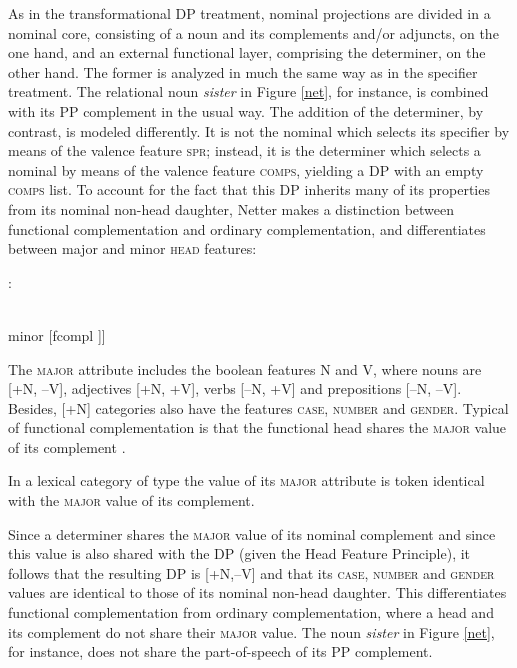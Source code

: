 \documentclass[output=paper
                ,modfonts
                ,nonflat
	        ,collection
	        ,collectionchapter
	        ,collectiontoclongg
 	        ,biblatex
                ,babelshorthands
                ,newtxmath
                ,draftmode
                ,colorlinks, citecolor=brown
]{./langsci/langscibook}
\begin{document}
As in the transformational DP treatment, nominal projections are divided in a nominal core, 
consisting of a noun and its complements and/or adjuncts, on the one hand, and an external 
functional layer, comprising the determiner, on the other hand. The former is analyzed in much the 
same way as in the specifier treatment. The relational noun   
\emph{sister} in Figure \ref{net}, for instance, is combined with 
its PP complement in the usual way. The addition of the determiner, by contrast, is 
modeled differently. It is not the nominal which selects its specifier by means of the valence 
feature \textsc{spr}; instead, it is the determiner which selects a nominal by means of 
the valence feature \textsc{comps}, yielding a DP with an empty \textsc{comps} list. 
To account for the fact that this DP inherits many of its properties from its nominal 
non-head daughter, Netter makes a distinction between functional 
complementation and ordinary complementation, and differentiates between major and minor 
\textsc{head} features: 

\begin{exe} 
\ex {}:\\
 \begin{avm}
                              [major [n \type{boolean} \\
                                      v \type{boolean} ] \\
                               minor [fcompl ]]
                              \end{avm} 
\end{exe} 

\noindent
The \textsc{major} attribute includes the boolean features N and V, where 
nouns are [+N, --V], adjectives [+N, +V], verbs [--N, +V] and prepositions [--N, --V]. 
Besides, [+N] categories also have the features \textsc{case}, \textsc{number} and \textsc{gender}. 
Typical of functional complementation is that the functional head shares the 
\textsc{major} value of its complement \citep[311--312]{Netter94}. 

\begin{exe} 
\ex\label{maj} In a lexical category of type  the value of its \textsc{major} 
      attribute is token identical with the \textsc{major} value of its complement. 
\end{exe} 

\noindent
Since a determiner shares the \textsc{major} value of its nominal complement and since this value is 
also shared with the DP (given the Head Feature Principle), it follows that the resulting 
DP is [+N,--V] and that its \textsc{case}, \textsc{number} and \textsc{gender} values are 
identical to those of its nominal non-head daughter. 
This differentiates functional complementation from ordinary complementation, where 
a head and its complement do not share their \textsc{major} value. The noun \emph{sister} 
in Figure \ref{net}, for instance, does not share the part-of-speech of its PP complement. 
\end{document}
